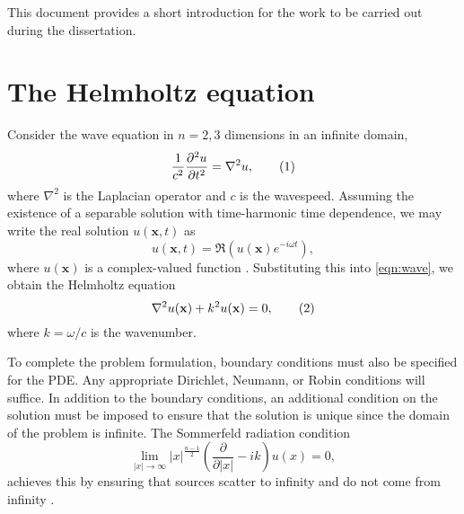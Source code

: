 
\iffalse Brief outline of the chapter below

Background:
	What is HH equation?
	What does it model?
	How is it derived?
	Boundary conditions
	- 	Sommerfield radiation condition
	
Finite element method:
	Discretisation of HH
	Discretisation of infinite domains
		D,N,radiation
	ABC, DtN, PML

Linear solvers:
	Iterative and direct
	Krylov methods
	Preconditioners
	How does this relate to Poisson and HH?
	- 	Small wavenumbers good convergence

Project direction:
	Where are we going? What to do...?
	Multigrid in non-cartesian coordinates
	Fourier decompostion of HH
	Explore implementation of PMLs
\fi


This document provides a short introduction for the work to be carried out during the dissertation.

\section{The Helmholtz equation}

Consider the wave equation in $n=2,3$ dimensions in an infinite domain,
\[
	\frac{1}{c^2} \frac{\partial^2 u}{\partial t^2} = 
		\nabla^2 u,\addtag \label{eqn:wave}
\]
where $\nabla^2$ is the Laplacian operator and $c$ is the wavespeed.
Assuming the existence of a separable solution with time-harmonic time dependence, we may write the real solution $u(\mathbf{x},t)$ as
\[
	u(\mathbf{x},t) = 
		\Re \left( u(\mathbf{x})e^{-i\omega t} \right),
\]
where $u(\mathbf{x})$ is a complex-valued function \citep{oomph_hh}.
Substituting this into \eqref{eqn:wave}, we obtain the Helmholtz equation
\[
	\nabla^2 u(\mathbf{x}) + k^2 u(\mathbf{x}) = 0, \addtag \label{eqn:hh}
\]
where $k=\omega/c$ is the wavenumber.

To complete the problem formulation, boundary conditions must also be specified for the PDE.
Any appropriate Dirichlet, Neumann, or Robin conditions will suffice.
In addition to the boundary conditions, an additional condition on the solution must be imposed to ensure that the solution is unique since the domain of the problem is infinite.
The Sommerfeld radiation condition
\[
\lim_{|x|\rightarrow \infty} |x|^{\frac{n-1}{2}} \left( \frac{\partial}{\partial |x|} - ik \right) u(x) = 0,
\]
achieves this by ensuring that sources scatter to infinity and do not come from infinity \citep{sommerfeld}.




